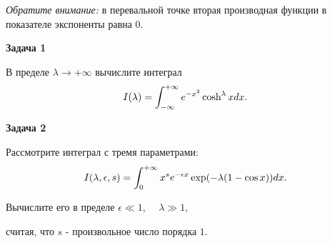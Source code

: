 \documentclass[a4paper,12pt]{article}
\begin{document}
\noindent \textit{Обратите внимание:} в перевальной точке вторая производная функции в показателе экспоненты равна 0.

\vspace{15pt}
\noindent \textbf{Задача 1}

\noindent В пределе $\lambda\rightarrow+\infty$ вычислите интеграл
\begin{equation}\notag
I(\lambda)	=\int_{-\infty}^{+\infty}e^{-x^{2}}\cosh^{\lambda}xdx.
\end{equation}

\vspace{15pt}
\noindent \textbf{Задача 2}

\noindent Рассмотрите интеграл с тремя параметрами:
\begin{equation}\notag
I(\lambda,\epsilon,s)	=\int_{0}^{+\infty}x^{s}e^{-\epsilon x}\exp(-\lambda(1-\cos x))dx.
\end{equation}

\noindent Вычислите его в пределе $\epsilon	\ll 1$, $\quad\lambda\gg1$,

\noindent считая, что $s$ - произвольное число порядка $1$.
\end{document}
